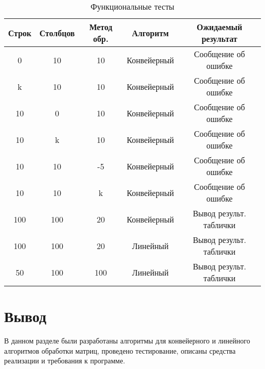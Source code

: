 \begin{table}[h]
	\begin{center}
		\begin{threeparttable}
			\captionsetup{justification=raggedleft,singlelinecheck=off}
			\caption{\label{tbl:functional_test} Функциональные тесты}
			\begin{tabular}{|c|c|c|c|c|}
				\hline
				Строк & Столбцов & Метод обр. & Алгоритм & Ожидаемый результат 
				\\ \hline
				0 & 10 & 10 & Конвейерный & Сообщение об ошибке 
				\\ \hline
				k & 10 & 10 & Конвейерный & Сообщение об ошибке 
				\\ \hline
				10 & 0 & 10 & Конвейерный & Сообщение об ошибке 
				\\ \hline
				10 & k & 10 & Конвейерный & Сообщение об ошибке 
				\\ \hline
				10 & 10 & -5 & Конвейерный & Сообщение об ошибке 
				\\ \hline
				10 & 10 & k & Конвейерный & Сообщение об ошибке 
				\\ \hline
				100 & 100 & 20 & Конвейерный & Вывод результ. таблички
				\\ \hline
				100 & 100 & 20 & Линейный & Вывод результ. таблички
				\\ \hline
				50 & 100 & 100 & Линейный & Вывод результ. таблички
				\\ \hline
			\end{tabular}
		\end{threeparttable}
	\end{center}
\end{table}
\section*{Вывод}
В данном разделе были разработаны алгоритмы для конвейерного и линейного алгоритмов обработки матриц, проведено тестирование, описаны средства реализации и требования к программе.